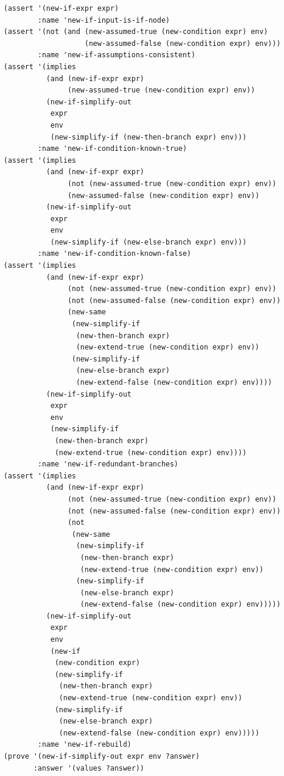 \documentclass[runningheads]{llncs}
\begin{document}
\begin{lstlisting}
(assert '(new-if-expr expr)
        :name 'new-if-input-is-if-node)
(assert '(not (and (new-assumed-true (new-condition expr) env)
                   (new-assumed-false (new-condition expr) env)))
        :name 'new-if-assumptions-consistent)
(assert '(implies
          (and (new-if-expr expr)
               (new-assumed-true (new-condition expr) env))
          (new-if-simplify-out
           expr
           env
           (new-simplify-if (new-then-branch expr) env)))
        :name 'new-if-condition-known-true)
(assert '(implies
          (and (new-if-expr expr)
               (not (new-assumed-true (new-condition expr) env))
               (new-assumed-false (new-condition expr) env))
          (new-if-simplify-out
           expr
           env
           (new-simplify-if (new-else-branch expr) env)))
        :name 'new-if-condition-known-false)
(assert '(implies
          (and (new-if-expr expr)
               (not (new-assumed-true (new-condition expr) env))
               (not (new-assumed-false (new-condition expr) env))
               (new-same
                (new-simplify-if
                 (new-then-branch expr)
                 (new-extend-true (new-condition expr) env))
                (new-simplify-if
                 (new-else-branch expr)
                 (new-extend-false (new-condition expr) env))))
          (new-if-simplify-out
           expr
           env
           (new-simplify-if
            (new-then-branch expr)
            (new-extend-true (new-condition expr) env))))
        :name 'new-if-redundant-branches)
(assert '(implies
          (and (new-if-expr expr)
               (not (new-assumed-true (new-condition expr) env))
               (not (new-assumed-false (new-condition expr) env))
               (not
                (new-same
                 (new-simplify-if
                  (new-then-branch expr)
                  (new-extend-true (new-condition expr) env))
                 (new-simplify-if
                  (new-else-branch expr)
                  (new-extend-false (new-condition expr) env)))))
          (new-if-simplify-out
           expr
           env
           (new-if
            (new-condition expr)
            (new-simplify-if
             (new-then-branch expr)
             (new-extend-true (new-condition expr) env))
            (new-simplify-if
             (new-else-branch expr)
             (new-extend-false (new-condition expr) env)))))
        :name 'new-if-rebuild)
(prove '(new-if-simplify-out expr env ?answer)
       :answer '(values ?answer))
\end{lstlisting}
\end{document}
